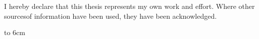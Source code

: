 {~}\vspace{12cm}

\noindent
\begin{minipage}{0.25\textwidth}~\end{minipage}
\begin{minipage}{0.68\textwidth}
I hereby declare that this thesis represents my own work and effort. Where other sourcesof information have been used, they have been acknowledged.

\bigskip\bigskip

\hfill\hbox to 6cm{\dotfill}
\end{minipage}
\vfill\eject 


